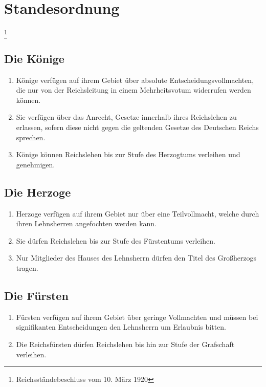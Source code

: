 \documentclass{article}
\begin{document}
\section{Standesordnung}\footnote{Reichsständebeschluss vom 10. März 1920}
\subsection{Die Könige}
\begin{enumerate}[(1)]
    \item Könige verfügen auf ihrem Gebiet über absolute Entscheidungsvollmachten, die nur von der Reichsleitung in einem Mehrheitsvotum widerrufen werden können.
    \item Sie verfügen über das Anrecht, Gesetze innerhalb ihres Reichslehen zu erlassen, sofern diese nicht gegen die geltenden Gesetze des Deutschen Reichs sprechen.
    \item Könige können Reichslehen bis zur Stufe des Herzogtums verleihen und genehmigen.
\end{enumerate}

\subsection{Die Herzoge}
\begin{enumerate}[(1)]
    \item Herzoge verfügen auf ihrem Gebiet nur über eine Teilvollmacht, welche durch ihren Lehnsherren angefochten werden kann.
    \item Sie dürfen Reichslehen bis zur Stufe des Fürstentums verleihen.
    \item Nur Mitglieder des Hauses des Lehnsherrn dürfen den Titel des Großherzogs tragen.
\end{enumerate}

\subsection{Die Fürsten}
\begin{enumerate}[(1)]
    \item Fürsten verfügen auf ihrem Gebiet über geringe Vollmachten und müssen bei signifikanten Entscheidungen den Lehnsherrn um Erlaubnis bitten.
    \item Die Reichsfürsten dürfen Reichslehen bis hin zur Stufe der Grafschaft verleihen.
\end{enumerate}
\end{document}
